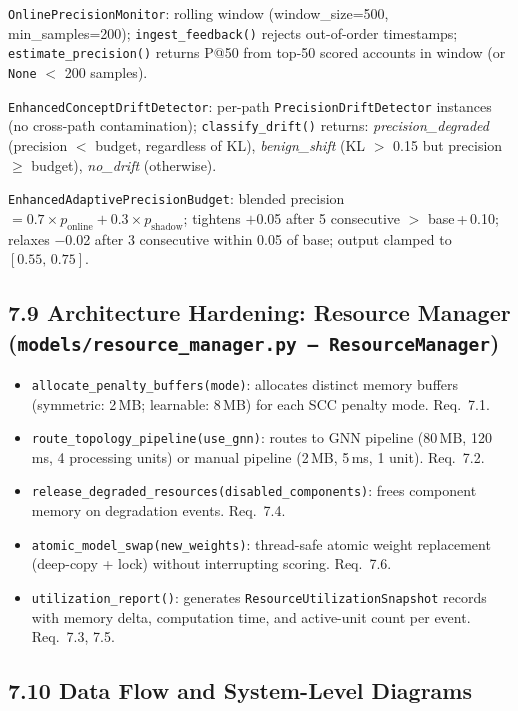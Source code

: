 \documentclass[12pt,a4paper]{article}
\begin{document}
\texttt{OnlinePrecisionMonitor}: rolling window (window\_size=500, min\_samples=200);
\texttt{ingest\_feedback()} rejects out-of-order timestamps; \texttt{estimate\_precision()}
returns P@50 from top-50 scored accounts in window (or \texttt{None} $<$ 200 samples).

\texttt{EnhancedConceptDriftDetector}: per-path \texttt{PrecisionDriftDetector} instances
(no cross-path contamination); \texttt{classify\_drift()} returns:
\textit{precision\_degraded} (precision $<$ budget, regardless of KL),
\textit{benign\_shift} (KL $>$ 0.15 but precision $\geq$ budget),
\textit{no\_drift} (otherwise).

\texttt{EnhancedAdaptivePrecisionBudget}: blended precision $= 0.7\times p_\text{online}
+ 0.3\times p_\text{shadow}$; tightens $+$0.05 after 5 consecutive $>$ base\,+\,0.10;
relaxes $-$0.02 after 3 consecutive within 0.05 of base; output clamped to $[0.55,\,0.75]$.

\subsection{7.9 Architecture Hardening: Resource Manager
          (\texttt{models/resource\_manager.py --- ResourceManager})}

\begin{itemize}[noitemsep,leftmargin=*]
  \item \texttt{allocate\_penalty\_buffers(mode)}: allocates distinct memory buffers
        (symmetric: 2\,MB; learnable: 8\,MB) for each SCC penalty mode. Req.~7.1.
  \item \texttt{route\_topology\_pipeline(use\_gnn)}: routes to GNN pipeline (80\,MB,
        120\,ms, 4 processing units) or manual pipeline (2\,MB, 5\,ms, 1 unit). Req.~7.2.
  \item \texttt{release\_degraded\_resources(disabled\_components)}: frees component memory
        on degradation events. Req.~7.4.
  \item \texttt{atomic\_model\_swap(new\_weights)}: thread-safe atomic weight replacement
        (deep-copy + lock) without interrupting scoring. Req.~7.6.
  \item \texttt{utilization\_report()}: generates \texttt{ResourceUtilizationSnapshot}
        records with memory delta, computation time, and active-unit count per event. Req.~7.3, 7.5.
\end{itemize}

\subsection{7.10 Data Flow and System-Level Diagrams}
\end{document}
